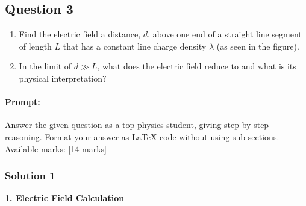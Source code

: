 \documentclass{article}
\begin{document}
\subsection{Question 3}
\begin{enumerate}
    \item Find the electric field a distance, \( d \), above one end of a straight line segment of length \( L \) that has a constant line charge density \( \lambda \) (as seen in the figure).
    \item In the limit of \( d \gg L \), what does the electric field reduce to and what is its physical interpretation?
\end{enumerate}


\paragraph{Prompt: \\} 
Answer the given question as a top physics student, giving step-by-step reasoning. Format your answer as LaTeX code without using sub-sections. Available marks: [14 marks]

\subsubsection{Solution 1}
\textbf{1. Electric Field Calculation}
\end{document}

